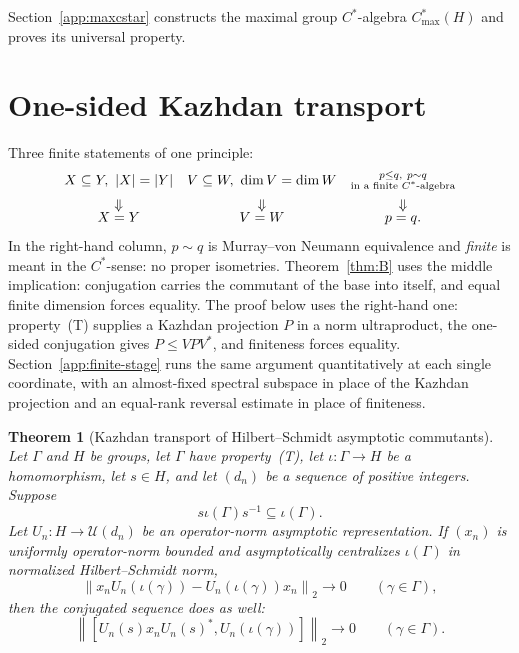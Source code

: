 \documentclass[11pt]{amsart}
\newcommand{\leanverified}[2]{\ignorespaces}
\newtheorem{theorem}{Theorem}[section]
\theoremstyle{definition}
\theoremstyle{remark}
\theoremstyle{plain}
\newcommand{\U}{\mathcal U}
\newcommand{\Cmax}{C^*_{\mathrm{max}}}
\newcommand{\hsnorm}[1]{\left\lVert #1\right\rVert_{2}}
\begin{document}
Section~\ref{app:maxcstar} constructs the maximal group $C^*$-algebra
$\Cmax(H)$ and proves its universal property.

\section{One-sided Kazhdan transport}\label{sec:transport}

Three finite statements of one principle:
\[
 \begin{array}{c@{\quad}c@{\quad}c}
 X\subseteq Y,\ |X|=|Y| & V\subseteq W,\ \dim V=\dim W
   & \substack{p\le q,\ p\sim q\\
       \text{in a finite }C^*\text{-algebra}}\\[2mm]
 \Downarrow & \Downarrow & \Downarrow\\[-1mm]
 X=Y & V=W & p=q.
 \end{array}
\]
In the right-hand column, $p\sim q$ is Murray--von Neumann equivalence
and \emph{finite} is meant in the $C^*$-sense: no proper isometries.
Theorem~\ref{thm:B} uses the middle implication: conjugation carries
the commutant of the base into itself, and equal finite dimension
forces equality.  The proof below uses the right-hand one:
property~\textup{(T)} supplies a Kazhdan projection $P$ in a norm
ultraproduct, the one-sided conjugation gives $P\le VPV^*$, and
finiteness forces equality.  Section~\ref{app:finite-stage} runs the
same argument quantitatively at each single coordinate, with an
almost-fixed spectral subspace in place of the Kazhdan projection and
an equal-rank reversal estimate in place of finiteness.

\begin{theorem}[Kazhdan transport of Hilbert--Schmidt asymptotic commutants]
\label{thm:kazhdan-transport}
Let $\Gamma$ and $H$ be groups, let $\Gamma$ have
property~\textup{(T)}, let $\iota\colon\Gamma\to H$ be a homomorphism, let
$s\in H$, and let $(d_n)$ be a sequence of positive integers.  Suppose
\[
 s\iota(\Gamma)s^{-1}\subseteq\iota(\Gamma).
\]
Let $U_n\colon H\to\U(d_n)$ be an operator-norm asymptotic representation.
If $(x_n)$ is uniformly operator-norm bounded and asymptotically
centralizes $\iota(\Gamma)$ in normalized Hilbert--Schmidt norm,
\[
 \hsnorm{x_nU_n(\iota(\gamma))-U_n(\iota(\gamma))x_n}\longrightarrow0
 \qquad(\gamma\in\Gamma),
\]
then the conjugated sequence does as well:
\leanverified{Sofic/ManuscriptKazhdanTransport}{GroupApproximation.KazhdanAsymptoticCommutant.manuscriptKazhdanTransport}
\[
\hsnorm{[U_n(s)x_nU_n(s)^*,U_n(\iota(\gamma))]}
\longrightarrow0
\qquad(\gamma\in\Gamma).
\]
\end{theorem}
\end{document}

